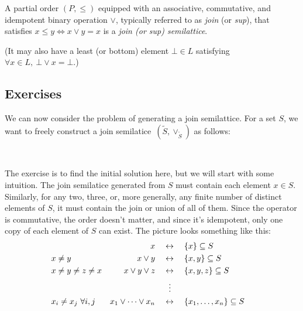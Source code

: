     \begin{definition}
    A partial order $(P, \leq)$ equipped with an associative, commutative, and
    idempotent binary operation $\lor$, typically referred to as \emph{join} (or
    \emph{sup}), that satisfies $x \leq y \iff x \vee y = x$ is a \emph{join (or
    sup) semilattice}.
    
    (It may also have a least (or bottom) element $\bot \in L$ satisfying
    $\forall x \in L,~\bot\lor x = \bot$.)
    \end{definition}
    
    \subsection{Exercises}
    
    We can now consider the problem of generating a join semilattice.  For a set
    $S$, we want to freely construct a join 
    semilatice~$(\widetilde S,\vee_{\widetilde S})$ as follows:
    \begin{center}
        \\[2mm]
    \end{center}
    The exercise is to find the initial solution here, but we will start with some
    intuition. The join semilatice generated from $S$ must contain each element
    $x\in S$. Similarly, for any two, three, or, more generally, any finite
    number of distinct elements of $S$, it must contain the join or union of all
    of them.  Since the operator is commutative, the order doesn't matter, and
    since it's idempotent, only one copy of each element of $S$ can exist. The
    picture looks something like this:
    \begin{align*}
    & 
    &
    x  & \quad\leftrightarrow\quad \{ x \} \subseteq S 
    \\
    & x\not= y 
    & x \lor y & \quad\leftrightarrow\quad \{ x,y \} \subseteq S 
    \\
    & x\not= y \not= z \not= x 
    &
    x \lor y \lor z & \quad\leftrightarrow\quad \{ x,y,z \} \subseteq S 
    \\
    & & 
    & \,\enspace\quad\vdots &
    \\
    &
    x_i \not= x_j\ \forall i,j
    & x_1 \lor \cdots \lor x_n & \quad\leftrightarrow\quad \{ x_1, \ldots, x_n \}
    \subseteq S
    \end{align*}
    
